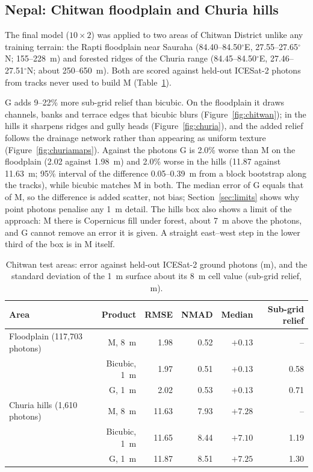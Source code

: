 \documentclass[11pt]{article}
\begin{document}
\subsection{Nepal: Chitwan floodplain and Churia hills}
\label{sec:nepal}
The final model ($10\times2$) was applied to two areas of Chitwan District unlike any training terrain: the Rapti
floodplain near Sauraha (84.40--84.50$^\circ$E, 27.55--27.65$^\circ$N; 155--228~m) and forested ridges of the Churia range
(84.45--84.50$^\circ$E, 27.46--27.51$^\circ$N; about 250--650~m). Both are scored against held-out ICESat-2 photons from
tracks never used to build M (Table~\ref{tab:nepal}).

G adds 9--22\% more sub-grid relief than bicubic. On the floodplain it draws channels, banks and terrace edges that
bicubic blurs (Figure~\ref{fig:chitwan}); in the hills it sharpens ridges and gully heads (Figure~\ref{fig:churia}), and
the added relief follows the drainage network rather than appearing as uniform texture (Figure~\ref{fig:churiamaps}).
Against the photons G is 2.0\% worse than M on the floodplain (2.02 against 1.98~m) and 2.0\% worse in the hills (11.87
against 11.63~m; 95\% interval of the difference 0.05--0.39~m from a block bootstrap along the tracks), while bicubic
matches M in both. The median error of G equals that of M, so the difference is added scatter, not bias;
Section~\ref{sec:limits} shows why point photons penalise any 1~m detail. The hills box also shows a limit of the
approach: M there is Copernicus fill under forest, about 7~m above the photons, and G cannot remove an error it is
given. A straight east--west step in the lower third of the box is in M itself.
\begin{table}[!htbp]
\centering\small
\caption{Chitwan test areas: error against held-out ICESat-2 ground photons (m), and the standard deviation of the 1~m
surface about its 8~m cell value (sub-grid relief, m).}
\label{tab:nepal}
\begin{tabular}{lrrrrr}
\toprule
Area & Product & RMSE & NMAD & Median & Sub-grid relief \\
\midrule
Floodplain (117{,}703 photons) & M, 8~m & 1.98 & 0.52 & $+0.13$ & -- \\
 & Bicubic, 1~m & 1.97 & 0.51 & $+0.13$ & 0.58 \\
 & G, 1~m & 2.02 & 0.53 & $+0.13$ & 0.71 \\
\midrule
Churia hills (1{,}610 photons) & M, 8~m & 11.63 & 7.93 & $+7.28$ & -- \\
 & Bicubic, 1~m & 11.65 & 8.44 & $+7.10$ & 1.19 \\
 & G, 1~m & 11.87 & 8.51 & $+7.25$ & 1.30 \\
\bottomrule
\end{tabular}
\end{table}
\end{document}
